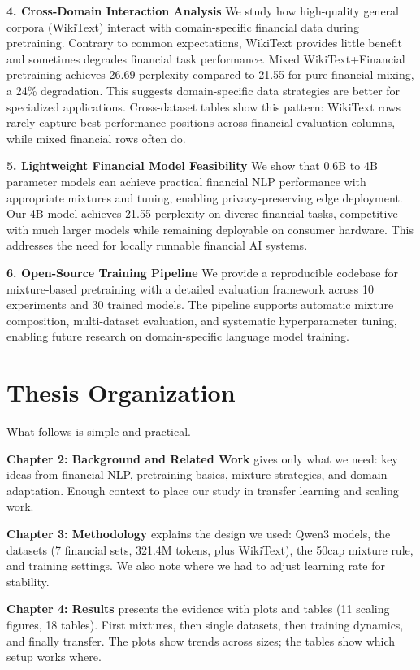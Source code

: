 \textbf{4. Cross-Domain Interaction Analysis}
We study how high-quality general corpora (WikiText) interact with domain-specific financial data during pretraining. Contrary to common expectations, WikiText provides little benefit and sometimes degrades financial task performance. Mixed WikiText+Financial pretraining achieves 26.69 perplexity compared to 21.55 for pure financial mixing, a 24\% degradation. This suggests domain-specific data strategies are better for specialized applications. Cross-dataset tables show this pattern: WikiText rows rarely capture best-performance positions across financial evaluation columns, while mixed financial rows often do.

\textbf{5. Lightweight Financial Model Feasibility}
We show that 0.6B to 4B parameter models can achieve practical financial NLP performance with appropriate mixtures and tuning, enabling privacy-preserving edge deployment. Our 4B model achieves 21.55 perplexity on diverse financial tasks, competitive with much larger models while remaining deployable on consumer hardware. This addresses the need for locally runnable financial AI systems.

\textbf{6. Open-Source Training Pipeline}
We provide a reproducible codebase for mixture-based pretraining with a detailed evaluation framework across 10 experiments and 30 trained models. The pipeline supports automatic mixture composition, multi-dataset evaluation, and systematic hyperparameter tuning, enabling future research on domain-specific language model training.

\section{Thesis Organization}

What follows is simple and practical.

\textbf{Chapter 2: Background and Related Work} gives only what we need: key ideas from financial NLP, pretraining basics, mixture strategies, and domain adaptation. Enough context to place our study in transfer learning and scaling work.

\textbf{Chapter 3: Methodology} explains the design we used: Qwen3 models, the datasets (7 financial sets, 321.4M tokens, plus WikiText), the 50cap mixture rule, and training settings. We also note where we had to adjust learning rate for stability.

\textbf{Chapter 4: Results} presents the evidence with plots and tables (11 scaling figures, 18 tables). First mixtures, then single datasets, then training dynamics, and finally transfer. The plots show trends across sizes; the tables show which setup works where.

